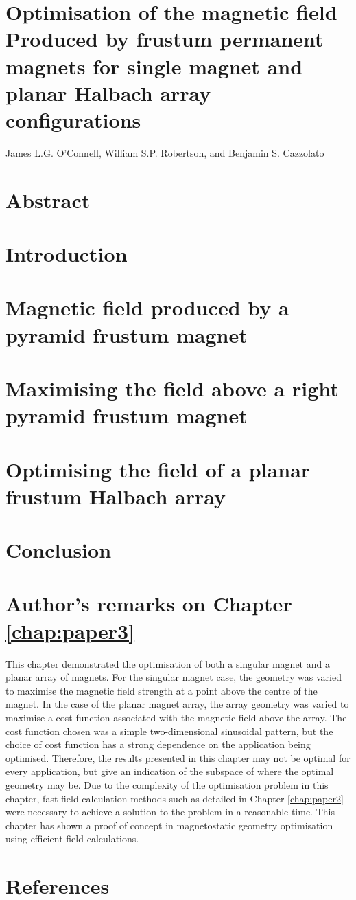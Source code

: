 %
%
\section*{\LARGE Optimisation of the magnetic field Produced by frustum permanent magnets for single magnet and planar Halbach array configurations}
James L.G. O'Connell, William S.P. Robertson, and Benjamin S. Cazzolato
\section*{Abstract}\label{sec:p3abstract}

\section{Introduction}\label{sec:p3introduction}

\section{Magnetic field produced by a pyramid frustum magnet}\label{sec:p3frustumField}

\section{Maximising the field above a right pyramid frustum magnet}\label{sec:p3pyramidFrustum}

\section{Optimising the field of a planar frustum Halbach array}\label{sec:p3planarArray}

\section{Conclusion}\label{sec:p3conclusion}

\clearpage
\section*{Author's remarks on Chapter \ref{chap:paper3}}
This chapter demonstrated the optimisation of both a singular magnet and a planar array of magnets. For the singular magnet case, the geometry was varied to maximise the magnetic field strength at a point above the centre of the magnet. In the case of the planar magnet array, the array geometry was varied to maximise a cost function associated with the magnetic field above the array. The cost function chosen was a simple two-dimensional sinusoidal pattern, but the choice of cost function has a strong dependence on the application being optimised. Therefore, the results presented in this chapter may not be optimal for every application, but give an indication of the subspace of where the optimal geometry may be. Due to the complexity of the optimisation problem in this chapter, fast field calculation methods such as detailed in Chapter \ref{chap:paper2} were necessary to achieve a solution to the problem in a reasonable time. This chapter has shown a proof of concept in magnetostatic geometry optimisation using efficient field calculations.

\newpage
\section*{References}
\printbibliography[heading=none]